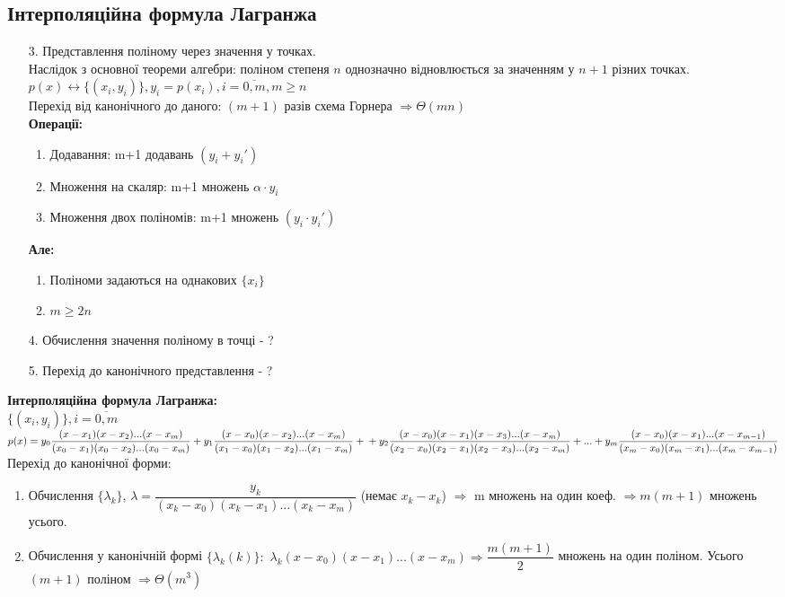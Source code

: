 \documentclass[a4paper,12pt]{article}
\begin{document}
    \subsection{Інтерполяційна формула Лагранжа}
    \begin{enumerate}
        \item[3.] Представлення поліному через значення у точках. \\
        Наслідок з основної теореми алгебри: поліном степеня $n$ однозначно відновлюється за значенням у $n+1$ різних точках. \\
        $p(x)\leftrightarrow\{(x_i,y_i)\}, y_i=p(x_i), i=\overline{0,m}, m\geqslant n$ \\
        Перехід від канонічного до даного: $(m+1)$ разів схема Горнера $\Rightarrow \Theta(mn)$ \\
        \textbf{Операції:}
        \begin{enumerate}
            \item Додавання: m+1 додавань $(y_i+y_i')$
            \item Множення на скаляр: m+1 множень $\alpha\cdot y_i$
            \item Множення двох поліномів: m+1 множень $(y_i\cdot y_i')$ 
        \end{enumerate}
        \textbf{Але:}
        \begin{enumerate}
            \item Поліноми задаються на однакових $\{x_i\}$
            \item $m\geqslant 2n$
        \end{enumerate}
        \item[4.] Обчислення значення поліному в точці - ?
        \item[5.] Перехід до канонічного представлення - ?
    \end{enumerate}
    \textbf{Інтерполяційна формула Лагранжа:} \\
    $\{(x_i,y_i)\}, i=\overline{0,m}$ \\
    $p(x)=y_0\dfrac{(x-x_1)(x-x_2)...(x-x_m)}{(x_0-x_1)(x_0-x_2)...(x_0-x_m)}+y_1\dfrac{(x-x_0)(x-x_2)...(x-x_m)}{(x_1-x_0)(x_1-x_2)...(x_1-x_m)}+\\+
    y_2\dfrac{(x-x_0)(x-x_1)(x-x_3)...(x-x_m)}{(x_2-x_0)(x_2-x_1)(x_2-x_3)...(x_2-x_m)}+...+
    y_m\dfrac{(x-x_0)(x-x_1)...(x-x_{m-1})}{(x_m-x_0)(x_m-x_1)...(x_m-x_{m-1})}$ \\
    Перехід до канонічної форми:
    \begin{enumerate}
        \item Обчислення $\{\lambda_k\}$, $\lambda=\dfrac{y_k}{(x_k-x_0)(x_k-x_1)...(x_k-x_m)}$ (немає $x_k-x_k$) $\Rightarrow$ m множень на один коеф. $\Rightarrow m(m+1)$ множень усього.
        \item Обчислення у канонічній формі $\{\lambda_k(k)\}:$ $\lambda_k(x-x_0)(x-x_1)...(x-x_m)\Rightarrow\dfrac{m(m+1)}{2}$ множень на один поліном. Усього $(m+1)$ поліном $\Rightarrow\Theta(m^3)$
    \end{enumerate}
\end{document}

